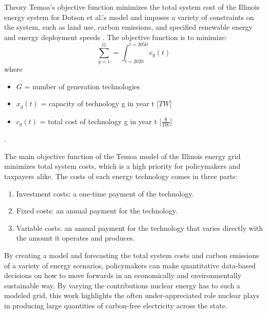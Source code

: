 \documentclass[final]{beamer}
\newlength{\onecolwid}
\newlength{\threecolwid}
\begin{document}
\begin{frame}[t]
\begin{columns}[t,totalwidth=\threecolwid]
\begin{column}{\onecolwid}
\begin{block}{Theory}
Temoa’s objective function minimizes the total system cost of the Illinois energy system for Dotson et al.’s model and imposes a variety of constraints on the system, such as land use, carbon emissions, and specified renewable energy and energy deployment speeds \cite{dotson}. The objective function is to minimize:
	\begin{equation} \label{eq:objective}
	  \sum_{g=1}^{G} = \int_{t=2020}^{t=2050}c_g(t)
	\end{equation} where \newline
	\begin{itemize}
	  \item $G$ = number of generation technologies
	  \item $x_g(t)$ = capacity of technology g in year t [$TW$]
	  \item $c_g(t)$ = total cost of technology g in year t [$\frac{\$}{TW}$]
	\end{itemize} \cite{dotson}.

	\vspace{0.7em}
	The main objective function of the Temoa model of the Illinois energy grid minimizes total system costs, which is a high priority for policymakers and taxpayers alike. The costs of each energy technology comes in three parts:

\begin{enumerate}
  \item Investment costs: a one-time payment of the technology.
  \item Fixed costs: an annual payment for the technology.
  \item Variable costs: an annual payment for the technology that varies directly with the amount it operates and produces.
\end{enumerate}
\vspace{0.7em}

By creating a model and forecasting the total system costs and carbon emissions of a variety of energy scenarios, policymakers can make quantitative data-based decisions on how to move forwards in an economically and environmentally sustainable way. By varying the contributions nuclear energy has to such a modeled grid, this work highlights the often under-appreciated role nuclear plays in producing large quantities of carbon-free electricity across the state.



\end{block}
\end{column}
\end{columns}
\end{frame}
\end{document}
